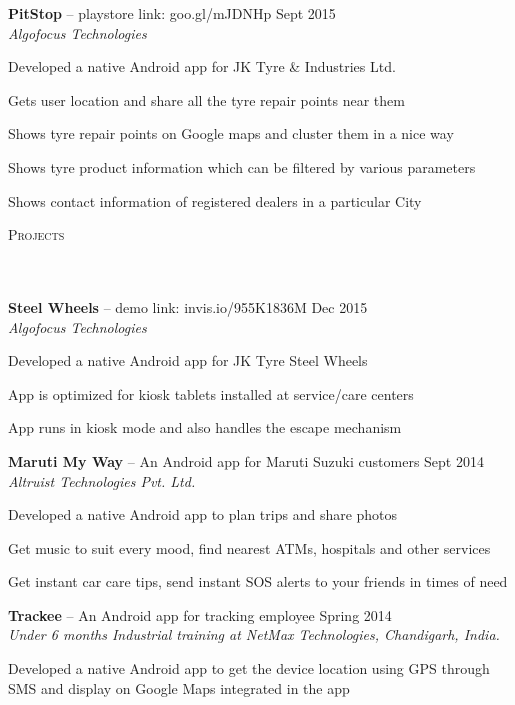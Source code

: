 \documentclass{article}
\newcommand{\header}[1]{{
\hspace*{-15pt}\vspace*{6pt} \textsc{#1}} \vspace*{-6pt} 
\lineunder
}
\newcommand{\lineunder}{
\vspace*{-8pt} \\ \hspace*{-18pt} 
\hrulefill \\
}
\newcommand{\project}[4]{{
\vspace*{2pt}%
\textbf{#1} #2 \hfill #3\\ \textit{#4} \vspace*{2pt}}
}
\renewcommand{\labelitemii}{
$\vcenter{\hbox{\tiny$\bullet$}}$\hspace*{-3pt}
}
\newenvironment{bullet-list-minor}{
\begin{list}{\labelitemii}{\setlength\leftmargin{15pt} 
\topsep 0pt \itemsep -2pt}}{\vspace*{4pt}\end{list}
}
\begin{document}
    \project{PitStop}{-- playstore link: goo.gl/mJDNHp}{Sept 2015}{Algofocus Technologies}
	\begin{bullet-list-minor}
	\item Developed a native Android app for JK Tyre \& Industries Ltd.
	\item Gets user location and share all the tyre repair points near them
	\item Shows tyre repair points on Google maps and cluster them in a nice way
	\item Shows tyre product information which can be filtered by various parameters 
	\item Shows contact information of registered dealers in a particular City 
	\end{bullet-list-minor}

\newpage
\vspace*{-20pt}
\header{Projects}
    \project{Steel Wheels}{-- demo link: invis.io/955K1836M}{Dec 2015}{Algofocus Technologies}
	\begin{bullet-list-minor}
    \item Developed a native Android app for JK Tyre Steel Wheels
    \item App is optimized for kiosk tablets installed at service/care centers
	\item App runs in kiosk mode and also handles the escape mechanism 
	\end{bullet-list-minor}
	
    \project{Maruti My Way}{-- An Android app for Maruti Suzuki customers}{Sept 2014}{Altruist Technologies Pvt. Ltd.}
	\begin{bullet-list-minor}
	\item Developed a native Android app to plan trips and share photos
	\item Get music to suit every mood, find nearest ATMs, hospitals and other services
	\item Get instant car care tips, send instant SOS alerts to your friends in times of need 
    \end{bullet-list-minor}

    \project{Trackee}{-- An Android app for tracking employee}{Spring 2014}{Under 6 months Industrial training at NetMax Technologies, Chandigarh, India.}
	\begin{bullet-list-minor}
	\item Developed a native Android app to get the device location using GPS through SMS and display on Google Maps integrated in the app
	\end{bullet-list-minor}
\end{document}
